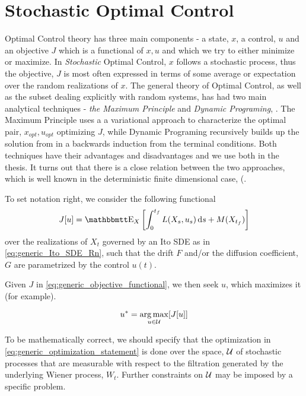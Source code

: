 \section{Stochastic Optimal Control}
Optimal Control theory has three main components - a state, $x$, a control, $u$
and an objective $J$ which is a functional of $x,u$ and which we try to either
minimize or maximize. In {\sl Stochastic } Optimal Control, $x$ follows a
stochastic process, thus the objective, $J$ is most often expressed in terms of
some average or expectation over the random realizations of $x$. The general
theory of Optimal Control, as well as the subset dealing explicitly with random
systems, has had two main analytical techniques - {\sl the Maximum Principle}
and {\sl Dynamic Programing}, \cite{Fleming1975}. The Maximum Principle uses a
a variational approach to characterize the optimal pair, $x_{opt}, u_{opt}$
optimizing $J$, while Dynamic Programing recursively builds up the solution from
in a backwards induction from the terminal conditions. Both techniques have
their advantages and disadvantages and we use both in the thesis. It turns out
that there is a close relation between the two approaches, which is well known
in the deterministic finite dimensional case, (\cite{Fleming1975,Evansb}. 

To set notation right, we consider the following functional
\begin{equation}
J[u] = \Exp_X \left[ \int_0^\tf L(X_s, u_s) \intd{s} + M(X_\tf) \right]
\label{eq:generic_objective_functional}
\end{equation}
over the realizations of $X_t$ governed by an Ito SDE as in
\cref{eq:generic_Ito_SDE_Rn}, such that the drift $F$ and/or the diffusion
coefficient, $G$ are parametrized by the control $u(t)$.

Given $J$ in \cref{eq:generic_objective_functional}, we then seek $u$, which
maximizes it (for example).

\begin{equation}
u^* = \argmax_{u \in \Udomain} [ J[u] ]
\label{eq:generic_optimization_statement}
\end{equation} 

To be mathematically correct, we should specify that the optimization in
\cref{eq:generic_optimization_statement} is done over the space, ${ \mathcal{U} }$ of
stochastic processes that are measurable with respect to the filtration
generated by the underlying Wiener process, $W_t$. Further constraints on
${ \mathcal{U} }$ may be imposed by a specific problem.

